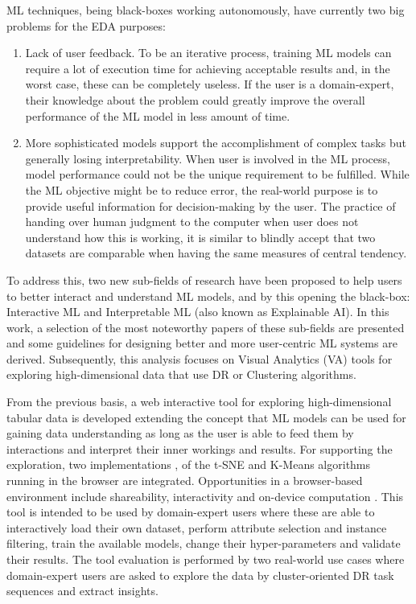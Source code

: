 
ML techniques, being black-boxes working autonomously, have currently two big problems for the EDA purposes: 

\begin{enumerate}
\item Lack of user feedback. To be an iterative process, training ML models can require a lot of execution time for achieving acceptable results and, in the worst case, these can be completely useless. If the user is a domain-expert, their knowledge about the problem could greatly improve the overall performance of the ML model in less amount of time.
\item More sophisticated models support the accomplishment of complex tasks but generally losing interpretability. When user is involved in the ML process, model performance could not be the unique requirement to be fulfilled. While the ML objective might be to reduce error, the real-world purpose is to provide useful information \cite{Lipton2017} for decision-making by the user. The practice of handing over human judgment to the computer when user does not understand how this is working, it is similar to blindly accept that two datasets are comparable when having the same measures of central tendency.
\end{enumerate}

To address this, two new sub-fields of research have been proposed to help users to better interact and understand ML models, and by this opening the black-box: Interactive ML and Interpretable ML (also known as Explainable AI). In this work, a selection of the most noteworthy papers of these sub-fields are presented and some guidelines for designing better and more user-centric ML systems are derived. Subsequently, this analysis focuses on Visual Analytics (VA) tools for exploring high-dimensional data that use DR or Clustering algorithms.

From the previous basis, a web interactive tool for exploring high-dimensional tabular data is developed extending the concept that ML models can be used for gaining data understanding as long as the user is able to feed them by interactions and interpret their inner workings and results. For supporting the exploration, two implementations \cite{Pezzotti2018LinearWeb},\cite{Asensio2018Ml-kmeans} of the t-SNE and K-Means algorithms running in the browser are integrated. Opportunities in a browser-based environment include shareability, interactivity and on-device computation \cite{Smilkov2019TensorFlow.js:Beyond}. This tool is intended to be used by domain-expert users where these are able to interactively load their own dataset, perform attribute selection and instance filtering, train the available models, change their hyper-parameters and validate their results. The tool evaluation is performed by two real-world use cases where domain-expert users are asked to explore the data by cluster-oriented DR task sequences \cite{Brehmer2014VisualizingSequences} and extract insights.

